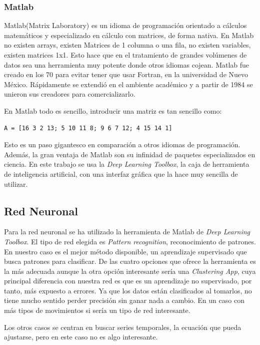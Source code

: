 \documentclass[12pt]{article}
\numberwithin{equation}{section}
\begin{document}
\subsubsection{Matlab}

Matlab(Matrix Laboratory) es un idioma de programación orientado a cálculos matemáticos y especializado en cálculo con matrices, de forma nativa. En Matlab no existen arrays, existen Matrices de 1 columna o una fila, no existen variables, existen matrices 1x1. Esto hace que en el tratamiento de grandes volúmenes de datos sea una herramienta muy potente donde otros idiomas cojean. Matlab fue creado en los 70 para evitar tener que usar Fortran, en la universidad de Nuevo México. Rápidamente se extendió en el ambiente académico y a partir de 1984 se unieron sus creadores para comercializarlo. 

En Matlab todo es sencillo, introducir una matriz es tan sencillo como:
\lstset{language=matlab}
\begin{lstlisting}
A = [16 3 2 13; 5 10 11 8; 9 6 7 12; 4 15 14 1]
\end{lstlisting}

Esto es un paso gigantesco en comparación a otros idiomas de programación. Además, la gran ventaja de Matlab son su infinidad de paquetes especializados en ciencia. En este trabajo se usa la \textit{Deep Learning Toolbox}, la caja de herramienta de inteligencia artificial, con una interfaz gráfica que la hace muy sencilla de utilizar.

\subsection{Red Neuronal}

Para la red neuronal se ha utilizado la herramienta de Matlab de \textit{Deep Learning Toolbox}\cite{Matlab}. El tipo de red elegida es  \textit{Pattern recognition}, reconocimiento de patrones. En nuestro caso es el mejor método disponible, un aprendizaje supervisado que busca patrones para clasificar. De las cuatro opciones que ofrece la herramienta es la más adecuada aunque la otra opción interesante sería una \textit{Clustering App}, cuya principal diferencia con nuestra red es que es un aprendizaje no supervisado, por tanto, más expuesto a errores. Ya que los datos están clasificados al tomarlos, no tiene mucho sentido perder precisión sin ganar nada a cambio. En un caso con más tipos de movimientos si sería un tipo de red interesante.

Los otros casos se centran en buscar series temporales, la ecuación que pueda ajustarse, pero en este caso no es algo interesante.
\end{document}
